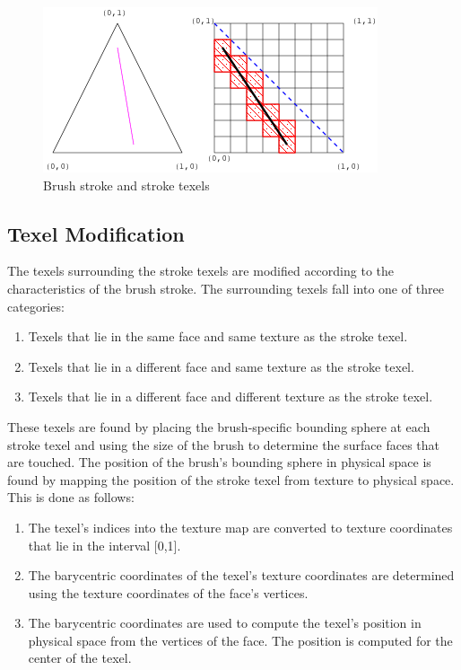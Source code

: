 \documentclass[10pt,twocolumn]{article}
\begin{document}
\begin{figure}
\begin{center}
\includegraphics[scale=0.6]{BrushStroke2.png}
\caption{Brush stroke and stroke texels}
\label{StrokeTexels}
\end{center}
\end{figure}

\subsection{Texel Modification}
\indent The texels surrounding the stroke texels are modified
according to the characteristics of the brush stroke.
The surrounding texels fall into one of three categories:

\begin{enumerate}
\item Texels that lie in the same face and same texture as the stroke texel.
\item Texels that lie in a different face and same texture as the stroke texel.
\item Texels that lie in a different face and different texture as the stroke texel.
\end{enumerate}

These texels are found by placing the brush-specific bounding sphere at each stroke texel and
using the size of the brush to determine the surface faces that are touched. 
The position of the brush's bounding sphere in physical space 
is found by mapping the position of the stroke texel from texture to physical space.
This is done as follows:
\begin{enumerate}
\item The texel's indices into the texture map are converted to texture coordinates
that lie in the interval [0,1].

\item The barycentric coordinates of the texel's texture coordinates are determined using
the texture coordinates of the face's vertices.

\item The barycentric coordinates are used to compute the texel's position in physical
space from the vertices of the face. The position is computed for the center of the
texel.

\end{enumerate}
\end{document}
